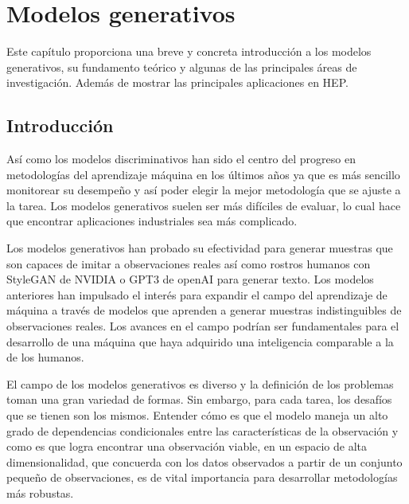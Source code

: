 
\chapter{Modelos generativos} %

\label{Chapter3} %


Este capítulo proporciona una breve y concreta introducción a los modelos generativos, su fundamento teórico y algunas de las principales áreas de investigación. Además de mostrar las principales aplicaciones en HEP.

\section{Introducción}

Así como los modelos discriminativos han sido el centro del progreso en metodologías del aprendizaje máquina en los últimos años ya que es más sencillo monitorear su desempeño y así poder elegir la mejor metodología que se ajuste a la tarea. Los modelos generativos suelen ser más difíciles de evaluar, lo cual hace que encontrar aplicaciones industriales sea más complicado. 

Los modelos generativos han probado su efectividad para generar muestras que son capaces de imitar a observaciones reales así como rostros humanos con StyleGAN de NVIDIA o GPT3 de openAI para generar texto. Los modelos anteriores han impulsado el interés para expandir el campo del aprendizaje de máquina a través de modelos que aprenden a generar muestras indistinguibles de observaciones reales. Los avances en el campo podrían ser fundamentales para el desarrollo de una máquina que haya adquirido una inteligencia comparable a la de los humanos.

El campo de los modelos generativos es diverso y la definición de los problemas toman una gran variedad de formas. Sin embargo, para cada tarea, los desafíos que se tienen son los mismos. Entender cómo  es que el modelo maneja un alto grado de dependencias condicionales entre las características de la observación y como es que logra encontrar una observación viable, en un espacio de alta dimensionalidad, que concuerda con los datos observados a partir de un conjunto pequeño de observaciones, es de vital importancia para desarrollar metodologías más robustas.

